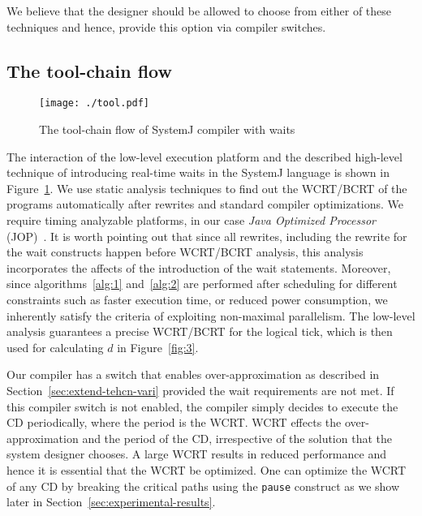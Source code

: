 We believe that the designer should be allowed to choose from either of
these techniques and hence, provide this option via compiler switches.

\subsection{The tool-chain flow}
\label{sec:tool-chain-flow}

\begin{figure}[h!]
  \centering
  \texttt{[image: ./tool.pdf]}
  \caption{The tool-chain flow of SystemJ compiler with waits}
  \label{fig:4}
\end{figure}

The interaction of the low-level execution platform and the described
high-level technique of introducing real-time waits in the SystemJ
language is shown in Figure~\ref{fig:4}. We use static analysis
techniques to find out the WCRT/BCRT of the programs automatically after
rewrites and standard compiler optimizations. We require timing
analyzable platforms, in our case \textit{Java Optimized Processor}
(JOP)~\cite{jop:jnl:jsa2007}. It is worth pointing out that since all
rewrites, including the rewrite for the wait constructs happen before
WCRT/BCRT analysis, this analysis incorporates the affects of the
introduction of the wait statements. Moreover, since
algorithms~\ref{alg:1} and~\ref{alg:2} are performed after scheduling
for different constraints such as faster execution time, or reduced
power consumption, we inherently satisfy the criteria of exploiting
non-maximal parallelism. The low-level analysis guarantees a precise
WCRT/BCRT for the logical tick, which is then used for calculating $d$
in Figure~\ref{fig:3}.

Our compiler has a switch that enables over-approximation as described
in Section~\ref{sec:extend-tehcn-vari} provided the wait requirements
are not met. If this compiler switch is not enabled, the compiler simply
decides to execute the CD periodically, where the period is the
WCRT. WCRT effects the over-approximation and the period of the CD,
irrespective of the solution that the system designer chooses. A large
WCRT results in reduced performance and hence it is essential that the
WCRT be optimized. One can optimize the WCRT of any CD by breaking the
critical paths using the \texttt{pause} construct as we show later in
Section~\ref{sec:experimental-results}.



